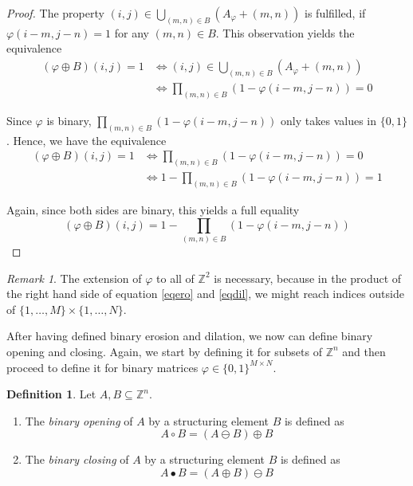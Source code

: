 \documentclass[a4paper,12pt]{article}
\theoremstyle{plain}
\theoremstyle{definition}
\newtheorem{definition}[theorem]{Definition}
\theoremstyle{remark}
\newtheorem{remark}[theorem]{Remark}
\begin{document}
\begin{proof}
	The property $(i, j) \in \bigcup_{(m, n) \in B} ( A_\varphi + (m, n) )$ is fulfilled, if $\varphi(i - m, j - n) = 1$ for any $(m, n) \in B$. This observation yields the equivalence
	\begin{align*}
		(\varphi \oplus B)(i, j) = 1 &\Leftrightarrow (i, j) \in \bigcup_{(m, n) \in B} ( A_\varphi + (m, n) ) \\
		&\Leftrightarrow \prod_{(m, n) \in B} ( 1 - \varphi(i - m, j - n) ) = 0
	\end{align*}
	
	Since $\varphi$ is binary, $\prod_{(m, n) \in B} ( 1 - \varphi(i - m, j - n) )$ only takes values in $\{ 0, 1 \}$. Hence, we have the equivalence
	\begin{align*}
		(\varphi \oplus B)(i, j) = 1 &\Leftrightarrow \prod_{(m, n) \in B} ( 1 - \varphi(i - m, j - n) ) = 0 \\
		&\Leftrightarrow 1 - \prod_{(m, n) \in B} ( 1 - \varphi(i - m, j - n) ) = 1
	\end{align*}
	
	Again, since both sides are binary, this yields a full equality
	\begin{equation*}
		(\varphi \oplus B)(i, j) = 1 - \prod_{(m, n) \in B} ( 1 - \varphi(i - m, j - n) )
	\end{equation*}
\end{proof}

\begin{remark}
	The extension of $\varphi$ to all of $\mathbb{Z}^2$ is necessary, because in the product of the right hand side of equation \eqref{eqero} and \eqref{eqdil}, we might reach indices outside of $\{ 1, \dots, M \} \times \{ 1, \dots, N \}$.
\end{remark}

After having defined binary erosion and dilation, we now can define binary opening and closing. Again, we start by defining it for subsets of $\mathbb{Z}^n$ and then proceed to define it for binary matrices $\varphi \in \{ 0, 1 \}^{M \times N}$.
\begin{definition}
	Let $A, B \subseteq \mathbb{Z}^n$.
	\begin{enumerate}
		\item The \emph{binary opening} of $A$ by a structuring element $B$ is defined as
		\begin{equation*}
			A \circ B = (A \ominus B) \oplus B
		\end{equation*}
		\item The \emph{binary closing} of  $A$ by a structuring element $B$ is defined as
		\begin{equation*}
			A \bullet B = (A \oplus B) \ominus B
		\end{equation*}
	\end{enumerate}
\end{definition}
\end{document}
